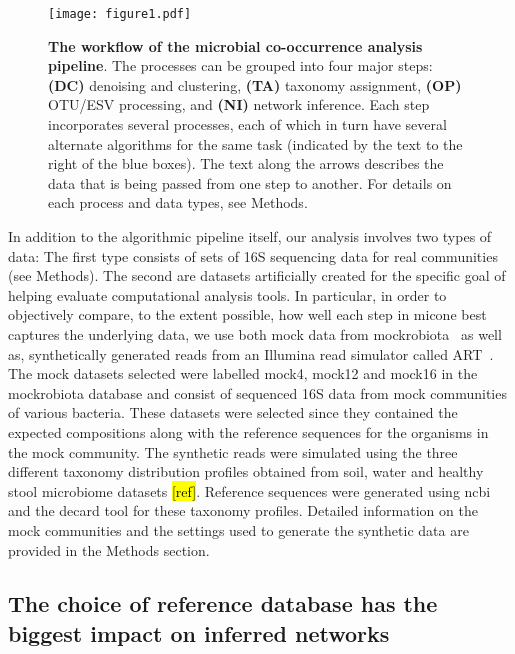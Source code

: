  \begin{figure}[h]
    \centering
    \texttt{[image: figure1.pdf]}
    \caption{
      \textbf{The workflow of the microbial co-occurrence analysis pipeline}.
      The processes can be grouped into four major steps: \textbf{(DC)} denoising and clustering, \textbf{(TA)} taxonomy assignment, \textbf{(OP)} OTU/ESV processing, and \textbf{(NI)} network inference.
      Each step incorporates several processes, each of which in turn have several alternate algorithms for the same task (indicated by the text to the right of the blue boxes).
      The text along the arrows describes the data that is being passed from one step to another. For details on each process and data types, see Methods.
    }
    \label{fig:figure1}
  \end{figure}

  In addition to the algorithmic pipeline itself, our analysis involves two types of data: The first type consists of sets of 16S sequencing data for real communities (see Methods). The second are datasets artificially created for the specific goal of helping evaluate computational analysis tools. In particular, in order to objectively compare, to the extent possible, how well each step in \ac{micone} best captures the underlying data, we use both mock data from mockrobiota~\cite{Bokulich2016} as well as, synthetically generated reads from an Illumina read simulator called ART~\cite{Huang2012}.
  The mock datasets selected were labelled mock4, mock12 and mock16 in the mockrobiota database and consist of sequenced 16S data from mock communities of various bacteria.
  These datasets were selected since they contained the expected compositions along with the reference sequences for the organisms in the mock community.
  The synthetic reads were simulated using the three different taxonomy distribution profiles obtained from soil, water and healthy stool microbiome datasets \hl{[ref]}.
  Reference sequences were generated using \ac{ncbi} and the decard tool \cite{Golob2017} for these taxonomy profiles.
  Detailed information on the mock communities and the settings used to generate the synthetic data are provided in the Methods section.


  \FloatBarrier

  \subsection*{The choice of reference database has the biggest impact on inferred networks}

